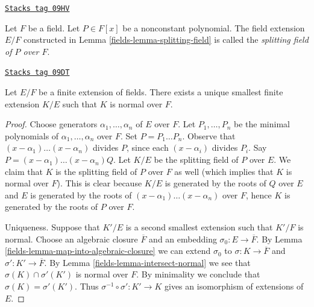 \begin{definition}
\label{fields-definition-splitting-field}
\href{https://stacks.math.columbia.edu/tag/09HV}{\texttt{Stacks tag 09HV}}

Let $F$ be a field. Let $P \in F[x]$ be a nonconstant polynomial.
The field extension $E/F$ constructed in Lemma \ref{fields-lemma-splitting-field}
is called the {\it splitting field of $P$ over $F$}.
\end{definition}

\begin{lemma}
\label{fields-lemma-normal-closure}
\href{https://stacks.math.columbia.edu/tag/09DT}{\texttt{Stacks tag 09DT}}


Let $E/F$ be a finite extension of fields. There exists a unique
smallest finite extension $K/E$ such that $K$ is normal over $F$.
\end{lemma}

\begin{proof}

Choose generators $\alpha_1, \ldots, \alpha_n$ of $E$ over $F$.
Let $P_1, \ldots, P_n$ be the minimal polynomials of
$\alpha_1, \ldots, \alpha_n$ over $F$. Set $P = P_1 \ldots P_n$.
Observe that $(x - \alpha_1) \ldots (x - \alpha_n)$ divides $P$, since
each $(x - \alpha_i)$ divides $P_i$. Say
$P = (x - \alpha_1) \ldots (x - \alpha_n)Q$.
Let $K/E$ be the splitting field of $P$ over $E$.
We claim that $K$ is the splitting field of $P$ over $F$ as well
(which implies that $K$ is normal over $F$).
This is clear because $K/E$ is generated by the roots of
$Q$ over $E$ and $E$ is generated by the roots of
$(x - \alpha_1) \ldots (x - \alpha_n)$ over $F$, hence
$K$ is generated by the roots of $P$ over $F$.

\medskip\noindent
Uniqueness. Suppose that $K'/E$ is a second smallest extension such that
$K'/F$ is normal. Choose an algebraic closure $\overline{F}$ and an
embedding $\sigma_0 : E \to \overline{F}$. By
Lemma \ref{fields-lemma-map-into-algebraic-closure}
we can extend $\sigma_0$ to $\sigma : K \to \overline{F}$ and
$\sigma' : K' \to \overline{F}$.
By Lemma \ref{fields-lemma-intersect-normal} we see that
$\sigma(K) \cap \sigma'(K')$ is normal over $F$.
By minimality we conclude that $\sigma(K) = \sigma'(K')$.
Thus $\sigma^{-1} \circ \sigma' : K' \to K$ gives an isomorphism
of extensions of $E$.
\end{proof}

